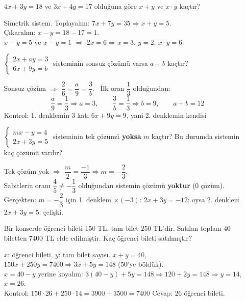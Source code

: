 \begin{alistirma}
\(4x+3y=18\) ve \(3x+4y=17\) olduğuna göre \(x+y\) ve \(x\cdot y\) kaçtır?
\end{alistirma}
\begin{cozum}
Simetrik sistem. Toplayalım: \(7x+7y=35\Rightarrow x+y=5\).\\
Çıkaralım: \(x-y=18-17=1\).\\
\(x+y=5\) ve \(x-y=1\) \(\Rightarrow\) \(2x=6\Rightarrow x=3\), \(y=2\). \quad \(x\cdot y=6\).
\end{cozum}

\begin{alistirma}
\(\begin{cases}2x+ay=3\\ 6x+9y=b\end{cases}\) sisteminin sonsuz çözümü varsa \(a+b\) kaçtır?
\end{alistirma}
\begin{cozum}
Sonsuz çözüm \(\Rightarrow\) \(\dfrac{2}{6}=\dfrac{a}{9}=\dfrac{3}{b}\). \ İlk oran \(\dfrac13\) olduğundan:
\[\frac{a}{9}=\frac13\Rightarrow a=3,\qquad \frac{3}{b}=\frac13\Rightarrow b=9,\qquad a+b=12\]
Kontrol: 1. denklemin \(3\) katı \(6x+9y=9\), yani 2. denklemin kendisi \checkmark
\end{cozum}

\begin{alistirma}
\(\begin{cases}mx-y=4\\ 2x+3y=5\end{cases}\) sisteminin tek çözümü \textbf{yoksa} \(m\) kaçtır? Bu durumda sistemin kaç çözümü vardır?
\end{alistirma}
\begin{cozum}
Tek çözüm yok \(\Rightarrow\) \(\dfrac{m}{2}=\dfrac{-1}{3}\Rightarrow m=-\dfrac23\).\\
Sabitlerin oranı \(\dfrac45\neq-\dfrac13\) olduğundan sistemin çözümü \textbf{yoktur} (\(0\) çözüm).\\
Gerçekten: \(m=-\dfrac23\) için 1. denklem \(\times(-3)\): \(2x+3y=-12\); oysa 2. denklem \(2x+3y=5\): çelişki.
\end{cozum}

\begin{alistirma}
Bir konserde öğrenci bileti \(150\) TL, tam bilet \(250\) TL'dir. Satılan toplam \(40\) biletten \(7400\) TL elde edilmiştir. Kaç öğrenci bileti satılmıştır?
\end{alistirma}
\begin{cozum}
\(x\): öğrenci bileti, \(y\): tam bilet sayısı. \quad \(x+y=40\), \ \(150x+250y=7400\Rightarrow 3x+5y=148\) (\(50\)'ye böldük).\\
\(x=40-y\) yerine koyalım: \(3(40-y)+5y=148\Rightarrow 120+2y=148\Rightarrow y=14\), \ \(x=26\).\\
Kontrol: \(150\cdot 26+250\cdot 14=3900+3500=7400\) \checkmark \quad Cevap: \(26\) öğrenci bileti.
\end{cozum}

